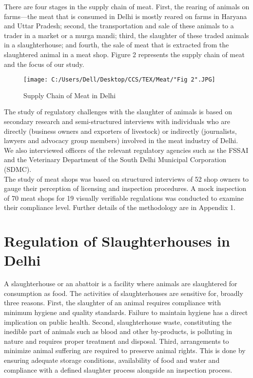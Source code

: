 \documentclass[a4paper, 12pt]{article}
\begin{document}
There are four stages in the supply chain of meat. First, the rearing of animals on farms—the meat that is consumed in Delhi is mostly reared on farms in Haryana and Uttar Pradesh; second, the transportation and sale of these animals to a trader in a market or a murga mandi; third, the slaughter of these traded animals in a slaughterhouse; and fourth, the sale of meat that is extracted from the slaughtered animal in a meat shop. Figure 2 represents the supply chain of meat and the focus of our study. \\

\begin{figure}[H]
\centering
\texttt{[image: C:/Users/Dell/Desktop/CCS/TEX/Meat/"Fig 2".JPG]}
\caption{Supply Chain of Meat in Delhi}
\end{figure} 

The study of regulatory challenges with the slaughter of animals is based on secondary research and semi-structured interviews with individuals who are directly (business owners and exporters of livestock) or indirectly (journalists, lawyers and advocacy group members) involved in the meat industry of Delhi. We also interviewed officers of the relevant regulatory agencies such as the FSSAI and the Veterinary Department of the South Delhi Municipal Corporation (SDMC).\\

The study of meat shops was based on structured interviews of 52 shop owners to gauge their perception of licensing and inspection procedures. A mock inspection of 70 meat shops for 19 visually verifiable regulations was conducted to examine their compliance level. Further details of the methodology are in Appendix 1. 
\\

\section{Regulation of Slaughterhouses in Delhi}

A slaughterhouse or an abattoir is a facility where animals are slaughtered for consumption as food. The activities of slaughterhouses are sensitive for, broadly three reasons. First, the slaughter of an animal requires compliance with minimum hygiene and quality standards. Failure to maintain hygiene has a direct implication on public health. Second, slaughterhouse waste, constituting the inedible part of animals such as blood and other by-products, is polluting in nature and requires proper treatment and disposal. Third, arrangements to minimize animal suffering are required to preserve animal rights. This is done by ensuring adequate storage conditions, availability of food and water and compliance with a defined slaughter process alongside an inspection process.\\
\end{document}
